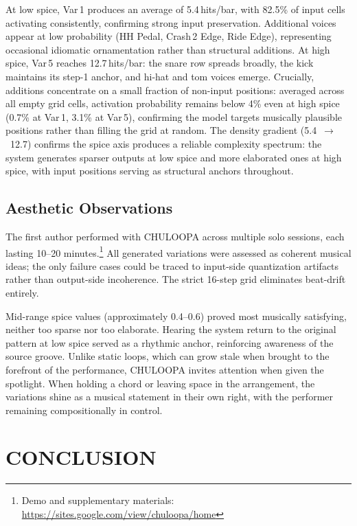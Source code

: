 \documentclass{aimc2026}
\begin{document}
At low spice, Var\,1 produces an average of 5.4\,hits/bar, with 82.5\% of input cells activating consistently, confirming strong input preservation. Additional voices appear at low probability (HH Pedal, Crash\,2 Edge, Ride Edge), representing occasional idiomatic ornamentation rather than structural additions. At high spice, Var\,5 reaches 12.7\,hits/bar: the snare row spreads broadly, the kick maintains its step-1 anchor, and hi-hat and tom voices emerge. Crucially, additions concentrate on a small fraction of non-input positions: averaged across all empty grid cells, activation probability remains below 4\% even at high spice (0.7\% at Var\,1, 3.1\% at Var\,5), confirming the model targets musically plausible positions rather than filling the grid at random. The density gradient (5.4~$\to$~12.7) confirms the spice axis produces a reliable complexity spectrum: the system generates sparser outputs at low spice and more elaborated ones at high spice, with input positions serving as structural anchors throughout.

\subsection{Aesthetic Observations}

The first author performed with CHULOOPA across multiple solo sessions, each lasting 10--20 minutes.\footnote{Demo and supplementary materials: \url{https://sites.google.com/view/chuloopa/home}} All generated variations were assessed as coherent musical ideas; the only failure cases could be traced to input-side quantization artifacts rather than output-side incoherence. The strict 16-step grid eliminates beat-drift entirely.

Mid-range spice values (approximately 0.4--0.6) proved most musically satisfying, neither too sparse nor too elaborate. Hearing the system return to the original pattern at low spice served as a rhythmic anchor, reinforcing awareness of the source groove. Unlike static loops, which can grow stale when brought to the forefront of the performance, CHULOOPA invites attention when given the spotlight. When holding a chord or leaving space in the arrangement, the variations shine as a musical statement in their own right, with the performer remaining compositionally in control.

\section{CONCLUSION}
\end{document}
